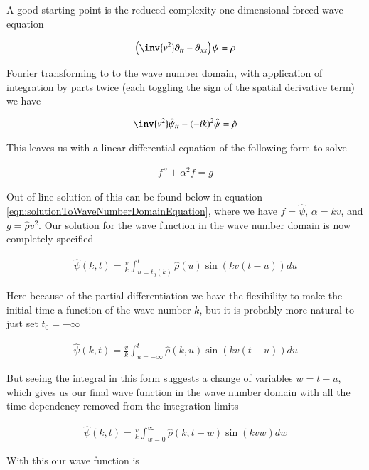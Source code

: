 \documentclass{article}
\begin{document}
A good starting point is the reduced complexity one dimensional forced
wave equation

\begin{align}
\left( \inv{v^2} \partial_{tt} -\partial_{xx} \right)\psi = \rho
\end{align}

Fourier transforming to to the wave number domain, with application of integration by parts twice (each toggling the sign of the spatial
derivative term) we have

\begin{align}
\inv{v^2}\hat{\psi}_{tt} - (-i k)^2 \hat{\psi} = \hat{\rho}
\end{align}

This leaves us with a linear differential equation of the following form to solve

\begin{align}\label{eqn:waveNumEquationToSolve}
f'' + \alpha^2 f = g
\end{align}

Out of line solution of this can be found below in equation \ref{eqn:solutionToWaveNumberDomainEquation}, where we have
$f = \hat{\psi}$, $\alpha = k v$, and $g = \hat{\rho} v^2$.  Our solution for the wave function in the wave number domain is now completely
specified

\begin{align*}
\hat{\psi}(k, t) = \frac{v}{k} \int_{u=t_0(k)}^t \hat{\rho}(u) \sin( k v (t-u) ) du
\end{align*}

Here because of the partial differentiation we have the flexibility to make the initial time a function of the wave number $k$, but it is probably
more natural to just set $t_0 = -\infty$

\begin{align*}
\hat{\psi}(k, t) = \frac{v}{k} \int_{u = -\infty}^t \hat{\rho}(k, u) \sin( k v (t-u) ) du
\end{align*}

But seeing the integral in this form suggests a change of variables $w = t-u$, which gives us our final wave function in the wave number domain with all the time
dependency removed from the integration limits

\begin{align*}
\hat{\psi}(k, t) = \frac{v}{k} \int_{w = 0}^\infty \hat{\rho}(k, t-w) \sin( k v w ) dw
\end{align*}

With this our wave function is
\end{document}
